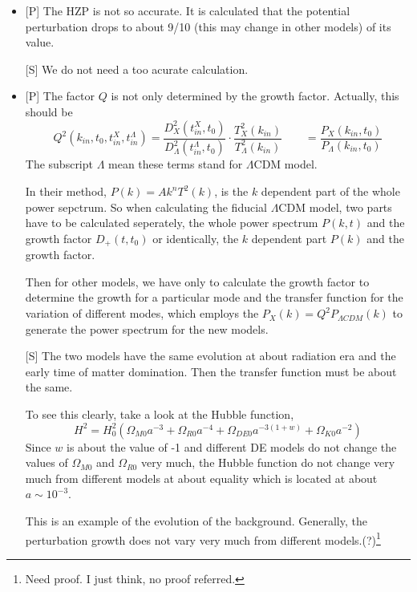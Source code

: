\documentclass{article}
\begin{document}
\begin{itemize}

\item

[P] The HZP is not so accurate. It is calculated that the potential perturbation drops to about 9/10 (this may change in other models) of its value.

[S] We do not need a too acurate calculation.

\item

[P] The factor $Q$ is not only determined by the growth factor. Actually, this should be
\begin{equation}
Q^2(k_{in},t_0,t^X_{in},t^{\Lambda}_{in})=\frac{D^2_X(t^X_{in},t_0)}{D^2_{\Lambda}(t^{\Lambda}_{in},t_0)}\cdot\frac{T^2_X(k_{in})}{T^2_{\Lambda}(k_{in})}\qquad=\frac{P_X(k_{in},t_0)}{P_{\Lambda}(k_{in},t_0)}
\end{equation}
The subscript $\Lambda$ mean these terms stand for $\Lambda$CDM model.


In their method, $P(k)=Ak^nT^2(k)$, is the $k$ dependent part of the whole power sepctrum. So when calculating the fiducial $\Lambda$CDM model, two parts have to be calculated seperately, the whole power spectrum $P(k,t)$ and the growth factor $D_+(t,t_0)$ or identically, the $k$ dependent part $P(k)$ and the growth factor. 

Then for other models, we have only to calculate the growth factor to determine the growth for a particular mode and the transfer function for the variation of different modes, which employs the $P_X(k)=Q^2P_{\Lambda CDM}(k)$ to generate the power spectrum for the new models.

[S] \label{TransferFunctionSame} The two models have the same evolution at about radiation era and the early time of matter domination. Then the transfer function must be about the same.

To see this clearly, take a look at the Hubble function,
\begin{equation}
H^2=H_0^2(\Omega_{M0}a^{-3}+\Omega_{R0}a^{-4}+\Omega_{DE0}a^{-3(1+w)}+\Omega_{K0}a^{-2})
\end{equation}
Since $w$ is about the value of -1 and different DE models do not change the values of $\Omega_{M0}$ and $\Omega_{R0}$ very much, the Hubble function do not change very much from different models at about equality which is located at about $a\sim 10^{-3}$.

This is an example of the evolution of the background. Generally, the perturbation growth  does not vary very much from different models.(?){\footnote{Need proof. I just think, no proof referred.}}


\end{itemize}
\end{document}
